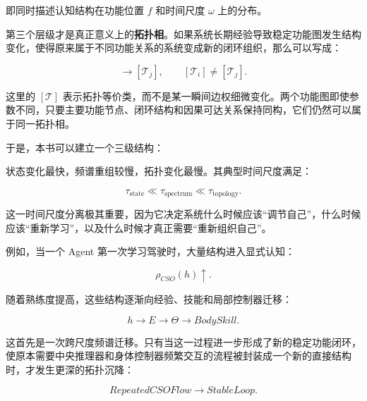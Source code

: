 即同时描述认知结构在功能位置 $f$ 和时间尺度 $\omega$ 上的分布。

第三个层级才是真正意义上的\textbf{拓扑相}。如果系统长期经验导致稳定功能图发生结构变化，使得原来属于不同功能关系的系统变成新的闭环组织，那么可以写成：

\begin{equation}
[\mathcal{T}_i]
\rightarrow
[\mathcal{T}_j],
\qquad
[\mathcal{T}_i]
\neq
[\mathcal{T}_j].
\end{equation}

这里的 $[\mathcal{T}]$ 表示拓扑等价类，而不是某一瞬间边权细微变化。两个功能图即使参数不同，只要主要功能节点、闭环结构和因果可达关系保持同构，它们仍然可以属于同一拓扑相。

于是，本书可以建立一个三级结构：

\begin{statementbox}
\centering
{}
\end{statementbox}

状态变化最快，频谱重组较慢，拓扑变化最慢。其典型时间尺度满足：

\begin{equation}
\tau_{\mathrm{state}}
\ll
\tau_{\mathrm{spectrum}}
\ll
\tau_{\mathrm{topology}}.
\end{equation}

这一时间尺度分离极其重要，因为它决定系统什么时候应该“调节自己”，什么时候应该“重新学习”，以及什么时候才真正需要“重新组织自己”。

例如，当一个 Agent 第一次学习驾驶时，大量结构进入显式认知：

\begin{equation}
\rho_{CSO}(h)
\uparrow.
\end{equation}

随着熟练度提高，这些结构逐渐向经验、技能和局部控制器迁移：

\begin{equation}
h
\rightarrow
E
\rightarrow
\Theta
\rightarrow
BodySkill.
\end{equation}

这首先是一次跨尺度频谱迁移。只有当这一过程进一步形成了新的稳定功能闭环，使原本需要中央推理器和身体控制器频繁交互的流程被封装成一个新的直接结构时，才发生更深的拓扑沉降：

\begin{equation}
RepeatedCSOFlow
\rightarrow
StableLoop.
\end{equation}

